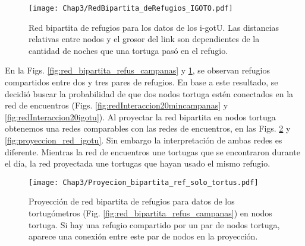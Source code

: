 \begin{figure}[ht]
    \begin{center}
        \texttt{[image: Chap3/RedBipartita\_deRefugios\_IGOTO.pdf]}
        \caption[Red bipartita de refugios para los datos de los i-gotU.]{Red bipartita de refugios para los datos de los i-gotU. Las distancias relativas entre nodos y el grosor del link son dependientes de la cantidad de noches que una  tortuga pasó en el refugio. }
        \label{fig:red_bipartita_refus_igotu}
       
        \end{center}
\end{figure}
En la Figs. \ref{fig:red_bipartita_refus_campanas} y \ref{fig:red_bipartita_refus_igotu}, se observan refugios compartidos entre dos y tres pares de refugios.  En base a este resultado, se decidió buscar la probabilidad de que dos nodos tortuga estén conectados en la red de encuentros (Figs. \ref{fig:redInteraccion20mincampanas} y \ref{fig:redInteraccion20igotu}). Al proyectar la red bipartita en nodos tortuga obtenemos una redes comparables con las redes de encuentros, en las Figs. \ref{fig:proyeccion_red_campanas} y \ref{fig:proyeccion_red_igotu}. Sin embargo la interpretación de ambas redes es diferente. Mientras la red de encuentros une tortugas que se encontraron durante el día, la red proyectada une tortugas que hayan usado el mismo refugio.
 
 
\begin{figure}[ht]
    \begin{center}
        \texttt{[image: Chap3/Proyecion\_bipartita\_ref\_solo\_tortus.pdf]}
        \caption[Proyección  de red bipartita de refugios para datos de los tortugómetros en nodos tortuga.]{Proyección  de red bipartita de refugios para datos de los tortugómetros (Fig. \ref{fig:red_bipartita_refus_campanas}) en nodos tortuga. Si hay una refugio compartido por un par de nodos tortuga, aparece una conexión entre este par de nodos en la proyección. }
        \label{fig:proyeccion_red_campanas}
       
        \end{center}
\end{figure}
 
